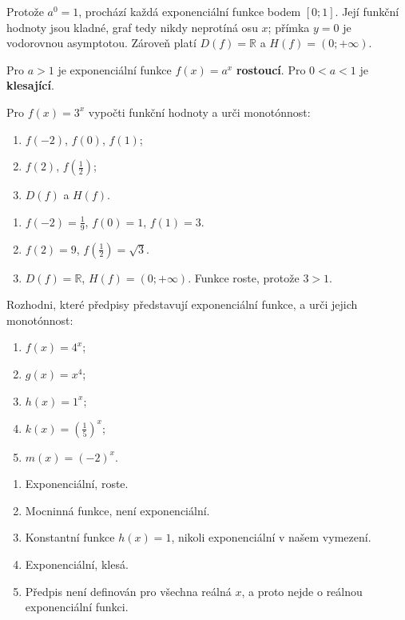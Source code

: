\documentclass[11pt,a4paper]{article}
\begin{document}
Protože $a^0=1$, prochází každá exponenciální funkce bodem $[0;1]$. Její funkční hodnoty jsou kladné, graf tedy nikdy neprotíná osu $x$; přímka $y=0$ je vodorovnou asymptotou. Zároveň platí $D(f)=\mathbb R$ a $H(f)=(0;+\infty)$.
\begin{zadaniBox}[title={Věta - Monotónnost exponenciální funkce}]
Pro $a>1$ je exponenciální funkce $f(x)=a^x$ \textbf{rostoucí}. Pro $0<a<1$ je \textbf{klesající}.
\end{zadaniBox}
\begin{prikladReseniBox}[title={Příklad 2}]
Pro $f(x)=3^x$ vypočti funkční hodnoty a urči monotónnost:
\begin{enumerate}[label=\alph*)]
\item $f(-2)$, $f(0)$, $f(1)$;
\item $f(2)$, $f(\frac{1}{2})$;
\item $D(f)$ a $H(f)$.
\end{enumerate}
\tcblower
\begin{enumerate}[label=\alph*)]
\item $f(-2)=\frac{1}{9}$, $f(0)=1$, $f(1)=3$.
\item $f(2)=9$, $f(\frac{1}{2})=\sqrt3$.
\item $D(f)=\mathbb R$, $H(f)=(0;+\infty)$. Funkce roste, protože $3>1$.
\end{enumerate}
\end{prikladReseniBox}
\begin{prikladReseniBox}[title={Příklad 3}]
Rozhodni, které předpisy představují exponenciální funkce, a urči jejich monotónnost:
\begin{enumerate}[label=\alph*)]
\item $f(x)=4^x$;
\item $g(x)=x^4$;
\item $h(x)=1^x$;
\item $k(x)=\left(\frac{1}{5}\right)^x$;
\item $m(x)=(-2)^x$.
\end{enumerate}
\tcblower
\begin{enumerate}[label=\alph*)]
\item Exponenciální, roste.
\item Mocninná funkce, není exponenciální.
\item Konstantní funkce $h(x)=1$, nikoli exponenciální v našem vymezení.
\item Exponenciální, klesá.
\item Předpis není definován pro všechna reálná $x$, a proto nejde o reálnou exponenciální funkci.
\end{enumerate}
\end{prikladReseniBox}
\end{document}
